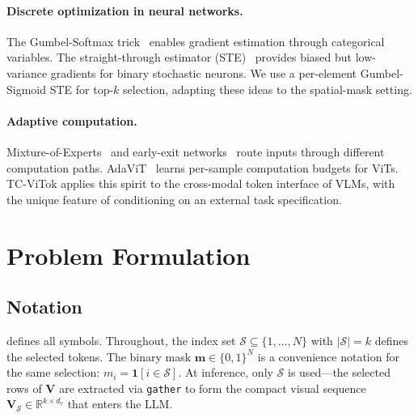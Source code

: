 \documentclass[11pt,a4paper]{article}
\newcommand{\R}{\mathbb{R}}
\newcommand{\vm}{\mathbf{m}}
\newcommand{\mV}{\mathbf{V}}
\begin{document}
\paragraph{Discrete optimization in neural networks.}
The Gumbel-Softmax trick~\citep{jang2017categorical,maddison2017concrete}
enables gradient estimation through categorical variables.
The straight-through estimator
(STE)~\citep{bengio2013estimating} provides biased but low-variance gradients
for binary stochastic neurons.
We use a per-element Gumbel-Sigmoid STE for top-$k$ selection, adapting these
ideas to the spatial-mask setting.

\paragraph{Adaptive computation.}
Mixture-of-Experts~\citep{shazeer2017moe} and early-exit
networks~\citep{teerapittayanon2016branchynet} route inputs through different
computation paths.
AdaViT~\citep{meng2022adavit} learns per-sample computation budgets for ViTs.
TC-ViTok applies this spirit to the cross-modal token interface of VLMs,
with the unique feature of conditioning on an external task specification.

\section{Problem Formulation}
\label{sec:formulation}

\subsection{Notation}

 defines all symbols.
Throughout, the index set $\mathcal{S} \subseteq \{1,\ldots,N\}$ with
$|\mathcal{S}| = k$ defines the selected tokens.
The binary mask $\vm \in \{0,1\}^N$ is a convenience notation for the
same selection: $m_i = \mathbf{1}[i \in \mathcal{S}]$.
At inference, only $\mathcal{S}$ is used---the selected rows of $\mV$ are
extracted via \texttt{gather} to form the compact visual sequence
$\mV_\mathcal{S} \in \R^{k \times d_v}$ that enters the LLM.
\end{document}

